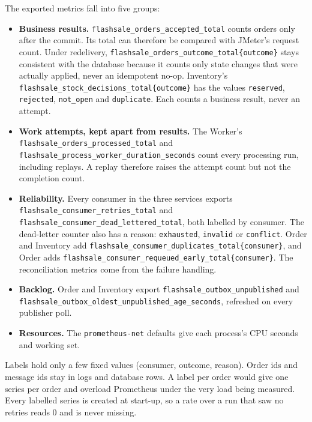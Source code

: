 \documentclass[a4paper]{report}
\begin{document}
The exported metrics fall into five groups:
\begin{itemize}\sloppy
  \item \textbf{Business results.}
    \texttt{flashsale\_orders\_\allowbreak accepted\_total} counts orders only
    after the commit. Its total can therefore be compared with JMeter's
    request count. Under redelivery,
    \texttt{flashsale\_orders\_\allowbreak outcome\_total\{outcome\}} stays
    consistent with the database because it counts only state changes that
    were actually applied, never an idempotent no-op. Inventory's
    \texttt{flashsale\_stock\_\allowbreak decisions\_total\{outcome\}} has the values
    \texttt{reserved}, \texttt{rejected}, \texttt{not\_open} and
    \texttt{duplicate}. Each counts a business result, never an attempt.
  \item \textbf{Work attempts, kept apart from results.} The Worker's
    \texttt{flashsale\_orders\_\allowbreak processed\_total} and
    \texttt{flashsale\_process\_worker\_\allowbreak duration\_seconds} count every
    processing run, including replays. A replay therefore raises the attempt
    count but not the completion count.
  \item \textbf{Reliability.} Every consumer in the three services exports
    \nolinkurl{flashsale_consumer_retries_total} and
    \nolinkurl{flashsale_consumer_dead_lettered_total}, both labelled by
    consumer. The dead-letter counter also has a reason: \texttt{exhausted}, \texttt{invalid} or
    \texttt{conflict}. Order and Inventory add
    \texttt{flashsale\_consumer\_duplicates\_total\{consumer\}}, and Order
    adds \texttt{flashsale\_consumer\_requeued\_early\_total\{consumer\}}.
    The reconciliation metrics come from the failure handling.
  \item \textbf{Backlog.} Order and Inventory export
    \nolinkurl{flashsale_outbox_unpublished} and
    \nolinkurl{flashsale_outbox_oldest_unpublished_age_seconds}, refreshed on
    every publisher poll.
  \item \textbf{Resources.} The \texttt{prometheus-net} defaults give each
    process's CPU seconds and working set.
\end{itemize}
Labels hold only a few fixed values (consumer, outcome, reason). Order ids and
message ids stay in logs and database rows. A label per order would give one
series per order and overload Prometheus under the very load being measured.
Every labelled series is created at start-up, so a rate over a run that saw
no retries reads 0 and is never missing.
\end{document}
